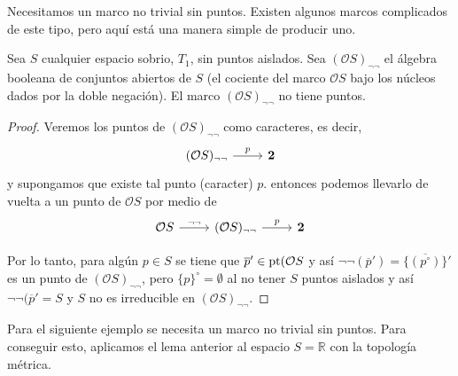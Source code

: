 Necesitamos un marco no trivial sin puntos. Existen algunos marcos complicados de este tipo, pero aquí está una manera simple de producir uno.

\begin{lem}\label{Lema7.2.6}
    Sea $S$ cualquier espacio sobrio, $T_1$, sin puntos aislados. Sea $(\mathcal{O}S)_{\neg\neg}$ el álgebra booleana de conjuntos abiertos de $S$ (el cociente del marco $\mathcal{O}S$ bajo los núcleos dados por la doble negación). El marco $(\mathcal{O}S)_{\neg\neg}$ no tiene puntos.
\end{lem}

\begin{proof}
    Veremos los puntos de $(\mathcal{O}S)_{\neg\neg}$ como caracteres, es decir,
    \[\begin{tikzcd}
	{(\mathcal{O}S)_{\neg\neg}} & {\mathbf{2}}
	\arrow["p", from=1-1, to=1-2]
\end{tikzcd}\]
    y supongamos que existe tal punto (caracter) $p$. entonces podemos llevarlo de vuelta a un punto de $\mathcal{O}S$ por medio de 
    \[\begin{tikzcd}
	{\mathcal{O}S} & {(\mathcal{O}S)_{\neg\neg}} & {\mathbf{2}}
	\arrow["{\neg\neg}", from=1-1, to=1-2]
	\arrow["p", from=1-2, to=1-3]
\end{tikzcd}\]

Por lo tanto, para algún $p\in S$ se tiene que $\overline{p}'\in \mathrm{pt}(\mathcal{O}S$ y así $\neg\neg (\overline{p}')=\overline{\{({p}^\circ)\}}'$ es un punto de $(\mathcal{O}S)_{\neg\neg}$, pero $\{p\}^\circ=\emptyset$ al no tener $S$ puntos aislados y así $\neg\neg(\overline{p}'=S$ y $S$ no es irreducible en $(\mathcal{O}S)_{\neg\neg}$.
\end{proof}

Para el siguiente ejemplo se necesita un marco no trivial sin puntos. Para conseguir esto, aplicamos el lema anterior al espacio $S=\mathbb{R}$ con la topología métrica.

